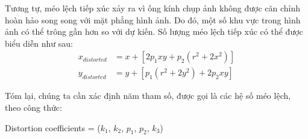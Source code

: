 \noindent Tương tự, méo lệch tiếp xúc xảy ra vì ống kính chụp ảnh không được căn chỉnh hoàn hảo song song với mặt phẳng hình ảnh. Do đó, một số khu vực trong hình ảnh có thể trông gần hơn so với dự kiến. Số lượng méo lệch tiếp xúc có thể được biểu diễn như sau:
\begin{equation*}
    \begin{aligned}
        x_{distorted} &= x + [2 p_1 x y + p_2(r^2 + 2x^2)]\\
        y_{distorted} &= y + [p_1 (r^2 + 2 y^2) + 2 p_2 x y]
    \end{aligned}
\end{equation*}

\noindent Tóm lại, chúng ta cần xác định năm tham số, được gọi là các hệ số méo lệch, theo công thức:
\begin{center}
    Distortion coefficients = ($k_1$, $k_2$, $p_1$, $p_2$, $k_3$)
\end{center}

